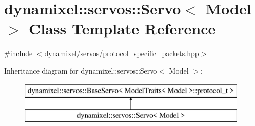 \hypertarget{classdynamixel_1_1servos_1_1_servo}{}\section{dynamixel\+:\+:servos\+:\+:Servo$<$ Model $>$ Class Template Reference}
\label{classdynamixel_1_1servos_1_1_servo}


{\ttfamily \#include $<$dynamixel/servos/protocol\+\_\+specific\+\_\+packets.\+hpp$>$}

Inheritance diagram for dynamixel\+:\+:servos\+:\+:Servo$<$ Model $>$\+:\begin{figure}[H]
\begin{center}
\leavevmode
\includegraphics[height=2.000000cm]{classdynamixel_1_1servos_1_1_servo}
\end{center}
\end{figure}
